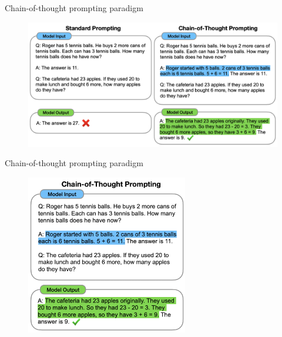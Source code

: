 \begin{vbframe}{Chain-of-thought prompting paradigm}

\vfill


\begin{figure}
    \centering
    \includegraphics{figure/chain_of_thought.png}\\
\end{figure}

\vfill

\end{vbframe}


\begin{vbframe}{Chain-of-thought prompting paradigm}

\begin{figure}
    \centering
    \includegraphics[height=7cm]{figure/chain_of_thought2.png}
\end{figure}

\end{vbframe}


